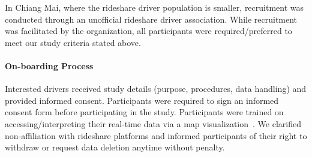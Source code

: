 In Chiang Mai, where the rideshare driver population is smaller, recruitment was conducted through an unofficial rideshare driver association. 
While recruitment was facilitated by the organization, all participants were required/preferred to meet our study criteria stated above.

\paragraph{On-boarding Process}

Interested drivers received study details (purpose, procedures, data handling) and provided informed consent.
Participants were required to sign an informed consent form before participating in the study.
Participants were trained on accessing/interpreting their real-time data via a map visualization~\cite{mapvis}.
We clarified non-affiliation with rideshare platforms and informed participants of their right to withdraw or request data deletion anytime without penalty.


